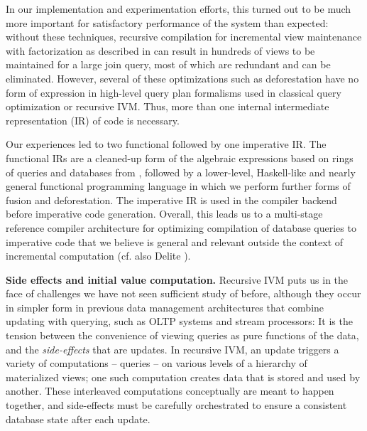 In our implementation and experimentation efforts, this turned out to be much more important for satisfactory performance of the system than expected: without these techniques, recursive compilation for incremental view maintenance with factorization as described in \cite{koch-pods:10} can result in hundreds of views to be maintained for a large join query, most of which are redundant and can be eliminated.
However, several of these optimizations such as deforestation have no form of expression in high-level query plan formalisms used in classical query optimization or recursive IVM. Thus, more than one internal intermediate representation (IR) of code is necessary.

Our experiences led to two functional followed by one imperative IR. The functional IRs are a cleaned-up form of the algebraic expressions based on rings of queries and databases from \cite{koch-pods:10}, followed by a lower-level, Haskell-like and nearly general functional programming language in which we perform further forms of fusion and deforestation. The imperative IR is used in the compiler backend before imperative code generation.  Overall, this leads us to a multi-stage reference compiler architecture for optimizing compilation of database queries to imperative code that we believe is general and relevant outside the context of incremental computation (cf. also Delite \cite{delite:11}).


{\bf Side effects and initial value computation.}
%
Recursive IVM puts us in the face of challenges we have not seen sufficient study of before, although they occur in simpler form in previous data management architectures that combine updating with querying, such as OLTP systems and stream processors: It is the tension between the convenience of viewing queries as pure functions of the data, and the {\em side-effects} that are updates.
In recursive IVM, an update triggers a variety of computations -- queries -- on various levels of a hierarchy of materialized views; one such computation creates data that is stored and used by another. These interleaved computations conceptually are meant to happen together, and side-effects must be carefully orchestrated to ensure a consistent database state after each update.

